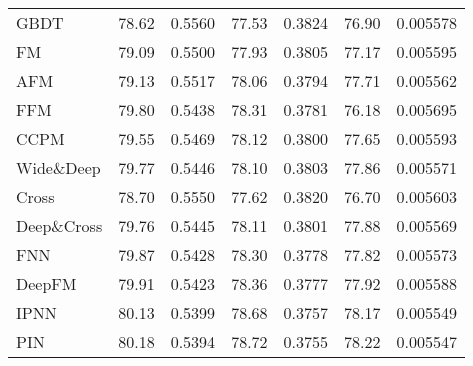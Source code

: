 \documentclass[letterpaper]{article} \usepackage{aaai21}  \usepackage{times}  \usepackage{helvet} \usepackage{courier}  \usepackage[hyphens]{url}  \usepackage{graphicx} \urlstyle{rm} \def\UrlFont{\rm}  \usepackage{natbib}  \usepackage{caption} \frenchspacing  \setlength{\pdfpagewidth}{8.5in}  \setlength{\pdfpageheight}{11in}  \usepackage{graphicx}
\begin{document}
\begin{table}[t]
{\begin{tabular}{p{1.25cm} <{\centering}|p{0.75cm} <{\centering} p{0.8cm} <{\centering}|p{0.75cm} <{\centering} p{0.83cm} <{\centering}|p{0.7cm} <{\centering} p{0.9cm} <{\centering}}
		GBDT                      & 78.62                  & 0.5560                &  77.53                    & 0.3824                  & 76.90                & 0.005578                  \\
FM                      & 79.09                  & 0.5500                  & 77.93                   & 0.3805              &  77.17                  & 0.005595                    \\
AFM                      & 79.13                    & 0.5517                    & 78.06                   & 0.3794                    & 77.71                    & 0.005562                   \\
FFM                      & 79.80                    & 0.5438                   & 78.31                    & 0.3781                    & 76.18                    & 0.005695                    \\
CCPM                      & 79.55                   & 0.5469                   & 78.12                    & 0.3800                    & 77.65                    & 0.005593                    \\
Wide\&Deep                      & 79.77                    & 0.5446                    & 78.10                    & 0.3803                    & 77.86                    & 0.005571                    \\
Cross                      & 78.70                    & 0.5550                  & 77.62                    & 0.3820                    & 76.70                    & 0.005603                   \\
		Deep\&Cross                      & 79.76                   & 0.5445                    & 78.11                    & 0.3801                 & 77.88                    & 0.005569                    \\
		FNN                      & 79.87                    & 0.5428                    & 78.30                    & 0.3778                   & 77.82                    & 0.005573                   \\
DeepFM                    & 79.91                    & 0.5423                   & 78.36                    & 0.3777                    & 77.92                    & 0.005588                   \\
IPNN                      & 80.13                    & 0.5399                   & 78.68                   & 0.3757                    & 78.17                    & 0.005549                   \\
PIN                      & 80.18                    & 0.5394                    & 78.72                    & 0.3755                  & 78.22                    & 0.005547                    \\

\end{tabular}}
\end{table}
\end{document}
